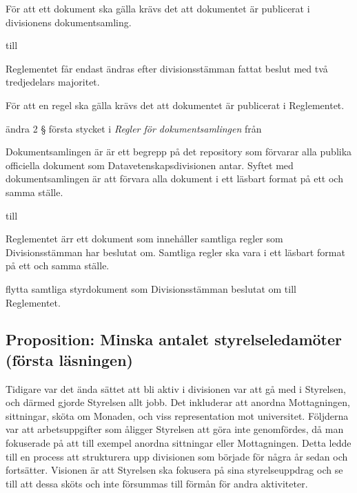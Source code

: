 \documentclass[protokoll]{dvd}
\begin{document}
\begin{attsatser}
\begin{displayquote}
		För att ett dokument ska gälla krävs det att dokumentet är publicerat i divisionens dokumentsamling.
	\end{displayquote}

	till

	\begin{displayquote}
		Reglementet får endast ändras efter divisionsstämman fattat beslut med två tredjedelars majoritet.

		För att en regel ska gälla krävs det att dokumentet är publicerat i Reglementet.
	\end{displayquote}

	\item ändra 2 § första stycket i \emph{Regler för dokumentsamlingen} från

	\begin{displayquote}
		Dokumentsamlingen är är ett begrepp på det repository som förvarar alla publika officiella dokument som Datavetenskapsdivisionen antar.
		Syftet med dokumentsamlingen är att förvara alla dokument i ett läsbart format på ett och samma ställe.
	\end{displayquote}

	till

	\begin{displayquote}
		Reglementet ärr ett dokument som innehåller samtliga regler som Divisionsstämman har beslutat om.
		Samtliga regler ska vara i ett läsbart format på ett och samma ställe.
	\end{displayquote}

	\item flytta samtliga styrdokument som Divisionsstämman beslutat om till Reglementet.
\end{attsatser}

\newpage
\subsection{Proposition: Minska antalet styrelseledamöter (första läsningen)}

Tidigare var det ända sättet att bli aktiv i divisionen var att gå med i Styrelsen, och därmed gjorde Styrelsen allt jobb.
Det inkluderar att anordna Mottagningen, sittningar, sköta om Monaden, och viss representation mot universitet.
Följderna var att arbetsuppgifter som åligger Styrelsen att göra inte genomfördes, då man fokuserade på att till exempel anordna sittningar eller Mottagningen.
Detta ledde till en process att strukturera upp divisionen som började för några år sedan och fortsätter.
Visionen är att Styrelsen ska fokusera på sina styrelseuppdrag och se till att dessa sköts och inte försummas till förmån för andra aktiviteter.
\end{document}
